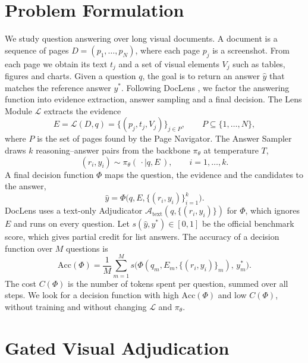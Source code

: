 \documentclass[pdflatex,sn-basic]{sn-jnl}%
\theoremstyle{thmstyletwo}%
\begin{document}
\section{Problem Formulation}
\label{sec:formulation}

We study question answering over long visual documents. A document is a sequence of pages $D=(p_1,\dots,p_N)$, where each page $p_j$ is a screenshot. From each page we obtain its text $t_j$ and a set of visual elements $V_j$ such as tables, figures and charts. Given a question $q$, the goal is to return an answer $\hat y$ that matches the reference answer $y^\ast$. Following DocLens \cite{zhu2025doclens}, we factor the answering function into evidence extraction, answer sampling and a final decision. The Lens Module $\mathcal{L}$ extracts the evidence
\begin{equation}
E=\mathcal{L}(D,q)=\{(p_j,t_j,V_j)\}_{j\in P},\qquad P\subseteq\{1,\dots,N\},
\label{eq:lens}
\end{equation}
where $P$ is the set of pages found by the Page Navigator. The Answer Sampler draws $k$ reasoning--answer pairs from the backbone $\pi_\theta$ at temperature $T$,
\begin{equation}
(r_i,y_i)\sim\pi_\theta(\,\cdot\mid q,E\,),\qquad i=1,\dots,k.
\label{eq:sampler}
\end{equation}
A final decision function $\Phi$ maps the question, the evidence and the candidates to the answer,
\begin{equation}
\hat y=\Phi\bigl(q,E,\{(r_i,y_i)\}_{i=1}^{k}\bigr).
\label{eq:decision}
\end{equation}
DocLens uses a text-only Adjudicator $\mathcal{A}_{\mathrm{text}}(q,\{(r_i,y_i)\})$ for $\Phi$, which ignores $E$ and runs on every question. Let $s(\hat y,y^\ast)\in[0,1]$ be the official benchmark score, which gives partial credit for list answers. The accuracy of a decision function over $M$ questions is
\begin{equation}
\mathrm{Acc}(\Phi)=\frac{1}{M}\sum_{m=1}^{M}s\bigl(\Phi(q_m,E_m,\{(r_i,y_i)\}_m),\,y^\ast_m\bigr).
\label{eq:acc}
\end{equation}
The cost $C(\Phi)$ is the number of tokens spent per question, summed over all steps. We look for a decision function with high $\mathrm{Acc}(\Phi)$ and low $C(\Phi)$, without training and without changing $\mathcal{L}$ and $\pi_\theta$.

\section{Gated Visual Adjudication}
\label{sec:method}
\end{document}
